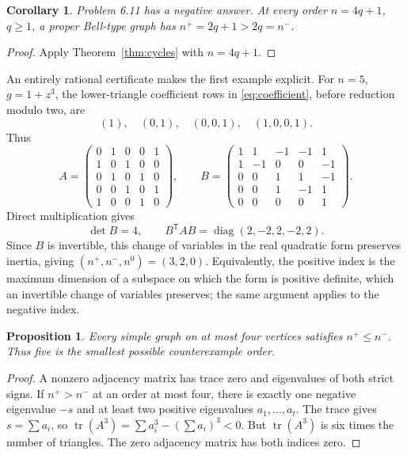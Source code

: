 \documentclass[11pt]{article}
\newtheorem{corollary}[theorem]{Corollary}
\newtheorem{proposition}[theorem]{Proposition}
\newcommand{\np}{n^+}
\newcommand{\nm}{n^-}
\begin{document}
\begin{corollary}\label{cor:answer}
Problem 6.11 has a negative answer. At every order $n=4q+1$,
$q\geq1$, a proper Bell-type graph has $\np=2q+1>2q=\nm$.
\end{corollary}
\begin{proof}
Apply Theorem~\ref{thm:cycles} with $n=4q+1$.
\end{proof}

An entirely rational certificate makes the first example explicit.
For $n=5$, $g=1+z^3$, the lower-triangle coefficient rows in
\eqref{eq:coefficient}, before reduction modulo two, are
\[
 (1),\quad (0,1),\quad (0,0,1),\quad (1,0,0,1).
\]
Thus
\[
A=\begin{pmatrix}
0&1&0&0&1\\1&0&1&0&0\\0&1&0&1&0\\0&0&1&0&1\\1&0&0&1&0
\end{pmatrix},\qquad
B=\begin{pmatrix}
1&1&-1&-1&1\\1&-1&0&0&-1\\0&0&1&1&-1\\0&0&1&-1&1\\0&0&0&0&1
\end{pmatrix}.
\]
Direct multiplication gives
\begin{equation}\label{eq:certificate}
 \det B=4,\qquad B^{\mathsf T}AB=\operatorname{diag}(2,-2,2,-2,2).
\end{equation}
Since $B$ is invertible, this change of variables in the real quadratic
form preserves inertia, giving $(\np,\nm,n^0)=(3,2,0)$.
Equivalently, the positive index is the maximum dimension of a subspace
on which the form is positive definite, which an invertible change of
variables preserves; the same argument applies to the negative index.

\begin{proposition}\label{prop:minimal}
Every simple graph on at most four vertices satisfies $\np\leq\nm$.
Thus five is the smallest possible counterexample order.
\end{proposition}
\begin{proof}
A nonzero adjacency matrix has trace zero and eigenvalues of both
strict signs. If $\np>\nm$ at an order at most four, there is exactly
one negative eigenvalue $-s$ and at least two positive eigenvalues
$a_1,\ldots,a_t$. The trace gives $s=\sum a_i$, so
$\operatorname{tr}(A^3)=\sum a_i^3-(\sum a_i)^3<0$.
But $\operatorname{tr}(A^3)$ is six times the number of triangles.
The zero adjacency matrix has both indices zero.
\end{proof}
\end{document}
